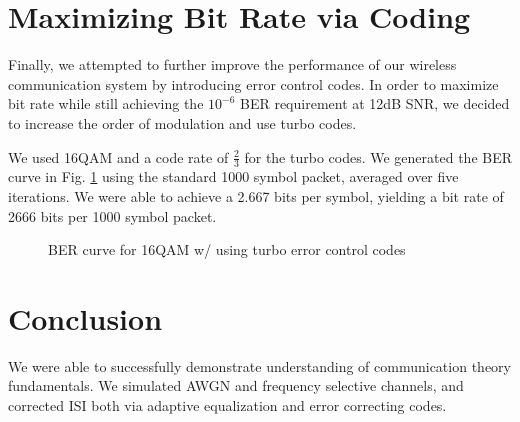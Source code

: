 \documentclass[conference]{IEEEtran}
\begin{document}
\section{Maximizing Bit Rate via Coding}
Finally, we attempted to further improve the performance of our wireless communication system by introducing error control codes. In order to maximize bit rate while still achieving the $10^{-6}$ BER requirement at 12dB SNR, we decided to increase the order of modulation and use turbo codes. 

We used 16QAM and a code rate of $\frac{2}{3}$ for the turbo codes. We generated the BER curve in Fig. \ref{turbo} using the standard 1000 symbol packet, averaged over five iterations. We were able to achieve a 2.667 bits per symbol, yielding a bit rate of 2666 bits per 1000 symbol packet.
\begin{figure}[htbp]
\caption{BER curve for 16QAM w/ using turbo error control codes}
\label{turbo}
\end{figure}

\section{Conclusion}
We were able to successfully demonstrate understanding of communication theory fundamentals. We simulated AWGN and frequency selective channels, and corrected ISI both via adaptive equalization and error correcting codes.
\end{document}
